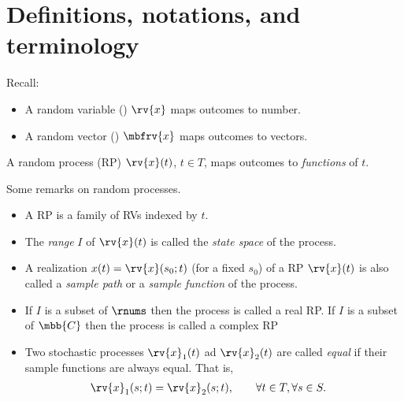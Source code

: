 \section{Definitions, notations, and terminology}
Recall: 
\begin{itemize}
    \item A random variable () $\rv{x}$ maps outcomes to number.
    \item A random vector () $\mbfrv{x}$ maps outcomes to vectors.
\end{itemize}
\begin{mydefinition}
    \label{def:random process}
    A random process (RP) $\rv{x}(t)$, $t\in T$, maps outcomes to \emph{functions} of $t$.
\end{mydefinition}
\begin{myremark}
    Some remarks on random processes. 
    \begin{itemize}
        \item A RP is a family of RVs indexed by $t$.
        \item The \emph{range} $I$ of $\rv{x}(t)$ is called the \emph{state space} of the process.
        \item A realization $x(t) = \rv{x}(s_{0}; t)$ (for a fixed $s_{0}$) of a RP $\rv{x}(t)$ is also called a \emph{sample path} or a \emph{sample function} of the process.
        \item If $I$ is a subset of $\rnums$ then the process is called a real RP. If $I$ is a subset of $\mbb{C}$ then the process is called a complex RP
        \item Two stochastic processes $\rv{x}_{1}(t)$ ad $\rv{x}_{2}(t)$ are called \emph{equal} if their sample functions are always equal. That is,
        \begin{align}
            \rv{x}_{1}(s; t) &= \rv{x}_{2}(s; t), \qquad \forall t\in T, \forall s\in S.
        \end{align}
    \end{itemize}
\end{myremark}


